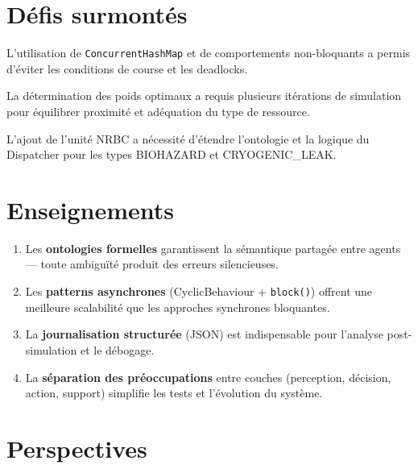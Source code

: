 \documentclass[12pt, a4paper]{report}
\begin{document}
\section{Défis surmontés}

\begin{description}[leftmargin=2cm, style=nextline, itemsep=6pt]
  \item[\color{OrangeNeon}Coordination asynchrone]
    L'utilisation de \texttt{ConcurrentHashMap} et de comportements non-bloquants a
    permis d'éviter les conditions de course et les deadlocks.

  \item[\color{CyanNeon}Calibrage de la fonction d'utilité]
    La détermination des poids optimaux a requis plusieurs itérations de simulation
    pour équilibrer proximité et adéquation du type de ressource.

  \item[\color{GreenNeon}Intégration du 9\textsuperscript{e} agent]
    L'ajout de l'unité NRBC a nécessité d'étendre l'ontologie et la logique du
    Dispatcher pour les types BIOHAZARD et CRYOGENIC\_LEAK.
\end{description}

\section{Enseignements}

\begin{enumerate}[leftmargin=*, itemsep=4pt]
  \item Les \textbf{ontologies formelles} garantissent la sémantique partagée entre
    agents --- toute ambiguïté produit des erreurs silencieuses.
  \item Les \textbf{patterns asynchrones} (CyclicBehaviour + \texttt{block()}) offrent
    une meilleure scalabilité que les approches synchrones bloquantes.
  \item La \textbf{journalisation structurée} (JSON) est indispensable pour l'analyse
    post-simulation et le débogage.
  \item La \textbf{séparation des préoccupations} entre couches (perception, décision,
    action, support) simplifie les tests et l'évolution du système.
\end{enumerate}

\section{Perspectives}
\end{document}
